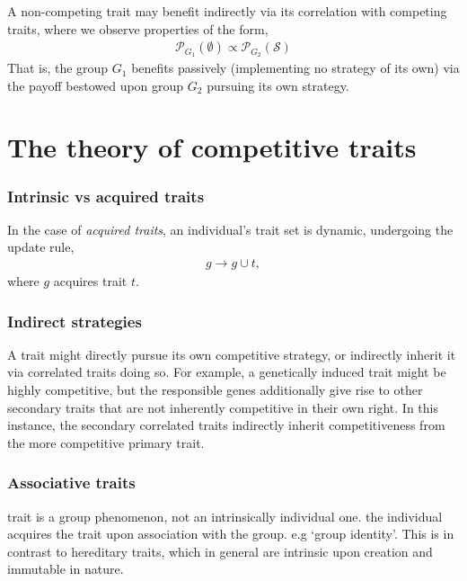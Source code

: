 \documentclass[twocolumn, aps, rmp, amsmath, amssymb, nofootinbib, superscriptaddress, longbibliography, floatfix, table-of-contents, eqsecnum]{revtex4-1}
\begin{document}
A non-competing trait may benefit indirectly via its correlation with competing traits, where we observe properties of the form,
\begin{align}
	\mathcal{P}_{G_1}(\emptyset) \propto \mathcal{P}_{G_2}(\mathcal{S})
\end{align}
That is, the group $G_1$ benefits passively (implementing no strategy of its own) via the payoff bestowed upon group $G_2$ pursuing its own strategy.

%
%

\part{The theory of competitive traits}

\section{Intrinsic vs acquired traits}

In the case of \textit{acquired traits}, an individual's trait set is dynamic, undergoing the update rule,
\begin{align}
	g\to g\cup t,	
\end{align}
where $g$ acquires trait $t$.

\section{Indirect strategies}

A trait might directly pursue its own competitive strategy, or indirectly inherit it via correlated traits doing so. For example, a genetically induced trait might be highly competitive, but the responsible genes additionally give rise to other secondary traits that are not inherently competitive in their own right. In this instance, the secondary correlated traits indirectly inherit competitiveness from the more competitive primary trait.

\section{Associative traits}

trait is a group phenomenon, not an intrinsically individual one. the individual acquires the trait upon association with the group. e.g `group identity'. This is in contrast to hereditary traits, which in general are intrinsic upon creation and immutable in nature.
\end{document}
